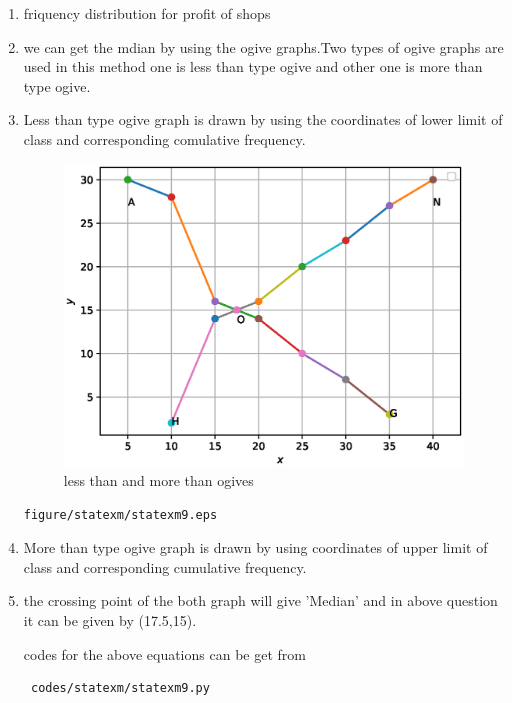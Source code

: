 \renewcommand{\theequation}{\theenumi}
\begin{enumerate}[label=\arabic*.,ref=\thesubsection.\theenumi]
\item \begin{table}[!ht]
	\centering
	
	\caption{friquency distribution for profit of shops }
\end{table}
\item we can get the mdian by using the ogive graphs.Two types of ogive graphs are used in this method one is less than type ogive and other one is more than type ogive.
\\
\item Less than type ogive graph is drawn by using the coordinates of lower limit of class and corresponding comulative frequency.
\\
\begin{figure}[!ht]
	\centering
	\includegraphics[width=\columnwidth]{./figures/statexm/statexm9.eps}
	\caption{less than and more than ogives }
	\label{ogive}
\end{figure}
\begin{lstlisting}
figure/statexm/statexm9.eps
\end{lstlisting}
\item More than type ogive graph is drawn by using coordinates of upper limit of class and corresponding cumulative frequency.
\\
\item the crossing point of the both graph will give 'Median' and in above question it can be given by (17.5,15).

 codes for the above equations can be get from
 \begin{lstlisting}
 codes/statexm/statexm9.py
 \end{lstlisting}
\end{enumerate}